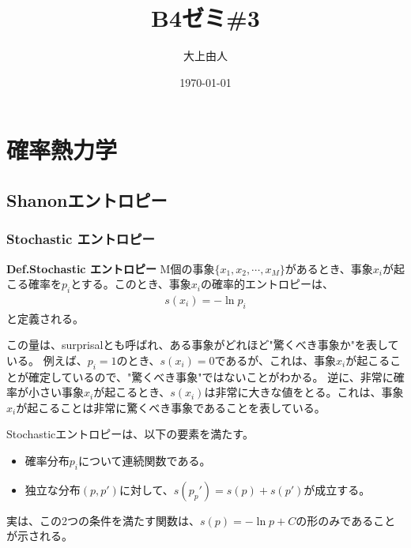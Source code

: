 \documentclass[a4paper,11pt]{jsarticle}
\numberwithin{equation}{section}
\begin{document}
\title{B4ゼミ\#3}
\author{大上由人}
\date{\today}
\maketitle

\setcounter{section}{2}
\section{確率熱力学}
\subsection{Shanonエントロピー}
\subsubsection{Stochastic エントロピー}
\begin{itembox}[l]{\textbf{Def.Stochastic エントロピー}}
    M個の事象$\{x_1, x_2, \cdots, x_M\}$があるとき、事象$x_i$が起こる確率を$p_i$とする。このとき、事象$x_i$の確率的エントロピーは、
    \begin{align}
        s(x_i) = -\ln p_i
    \end{align}
    と定義される。
\end{itembox}
この量は、surprisalとも呼ばれ、ある事象がどれほど"驚くべき事象か"を表している。
例えば、$p_i = 1$のとき、$s(x_i) = 0$であるが、これは、事象$x_i$が起こることが確定しているので、"驚くべき事象"ではないことがわかる。
逆に、非常に確率が小さい事象$x_i$が起こるとき、$s(x_i)$は非常に大きな値をとる。これは、事象$x_i$が起こることは非常に驚くべき事象であることを表している。

Stochasticエントロピーは、以下の要素を満たす。
\begin{itemize}
    \item 確率分布$p_i$について連続関数である。
    \item 独立な分布$(p,p')$に対して、$s(p_p') = s(p) + s(p')$が成立する。
\end{itemize}
実は、この2つの条件を満たす関数は、$s(p) = -\ln p + C$の形のみであることが示される。
\end{document}
